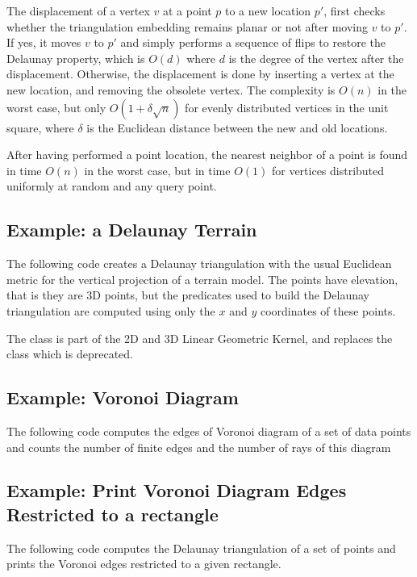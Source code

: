 The displacement of a vertex $v$ at a point $p$ to a new location $p'$, first checks whether the triangulation embedding remains
planar or not after moving $v$ to $p'$. If yes, it moves $v$ to $p'$ and simply performs a sequence of flips
to restore the Delaunay property, which is $O(d)$ where $d$ is the degree of the vertex after the displacement. 
Otherwise, the displacement is done by inserting a vertex at the new location,
and removing the obsolete vertex. 
The complexity is $O(n)$ in the worst case, but only $O(1 + \delta \sqrt{n})$ for evenly distributed vertices in the unit square, where $\delta$ is the Euclidean distance between the new and old locations.

After having performed a  point location, the
nearest neighbor of a point is found in time $O(n)$ in the
worst case, but in time $O(1)$
for vertices distributed uniformly at random  and any query point. 


\subsection{Example: a Delaunay Terrain\label{Subsection_2D_Triangulations_Delaunay_Terrain}}

The following code  creates a Delaunay triangulation with 
the usual Euclidean metric for the vertical projection of a 
terrain model. The points have elevation, that is they are 3D points,
but the predicates used to build the  Delaunay triangulation
are computed using only  the $x$ and $y$ coordinates  
of these points. 

The class  is part of the 2D and 3D Linear Geometric Kernel,
and replaces the class  which is deprecated.


\subsection{Example: Voronoi Diagram\label{Subsection_2D_Triangulations_Voronoi}}
The following code computes the edges of Voronoi diagram
of a set of data points
and counts  the number of finite edges and the number of rays
of this diagram


\subsection{Example: Print Voronoi Diagram Edges Restricted to a rectangle \label{Subsection_2D_Triangulations_Cropped_Voronoi}}
The following code computes the Delaunay triangulation of a set of points and prints the Voronoi edges 
restricted to a given rectangle.

